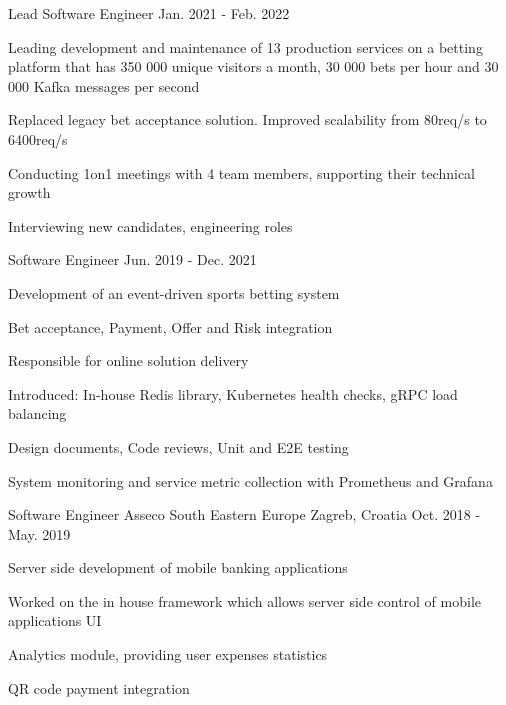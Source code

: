 \begin{cventries}
  \cventry
    {Lead Software Engineer} %
    {} %
    {} %
    {Jan. 2021 - Feb. 2022} %
    {
      \begin{cvitems} %
        \item {Leading development and maintenance of 13 production services on a betting platform that has 350 000 unique visitors a month, 30 000 bets per hour and 30 000 Kafka messages per second}
        \item {Replaced legacy bet acceptance solution. Improved scalability from 80req/s to 6400req/s}
        \item {Conducting 1on1 meetings with 4 team members, supporting their technical growth}
        \item {Interviewing new candidates, engineering roles}
      \end{cvitems}
    }

  \cventry
    {Software Engineer} %
    {} %
    {} %
    {Jun. 2019 - Dec. 2021} %
    {
      \begin{cvitems} %
        \item {Development of an event-driven sports betting system}
        \item {Bet acceptance, Payment, Offer and Risk integration}
        \item {Responsible for online solution delivery}
        \item {Introduced: In-house Redis library, Kubernetes health checks, gRPC load balancing}
        \item {Design documents, Code reviews, Unit and E2E testing}
        \item {System monitoring and service metric collection with Prometheus and Grafana}
      \end{cvitems}
    }

  \cventry
    {Software Engineer} %
    {Asseco South Eastern Europe} %
    {Zagreb, Croatia} %
    {Oct. 2018 - May. 2019} %
    {
      \begin{cvitems} %
        \item {Server side development of mobile banking applications}
        \item {Worked on the in house framework which allows server side control of mobile applications UI}
        \item {Analytics module, providing user expenses statistics}
        \item {QR code payment integration}
      \end{cvitems}
    }

\end{cventries}
